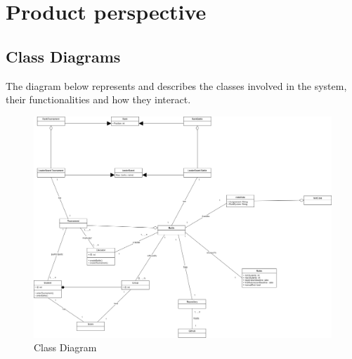 \section{Product perspective}
\subsection{Class Diagrams}
The diagram below represents and describes the classes involved in the system, their functionalities and how they interact.

\begin{figure}[ht]
    \centering
    \includegraphics[width=1\linewidth]{misc//Images/classDiagram.png}
    \caption{Class Diagram}
    \label{fig:enter-label}
\end{figure}



